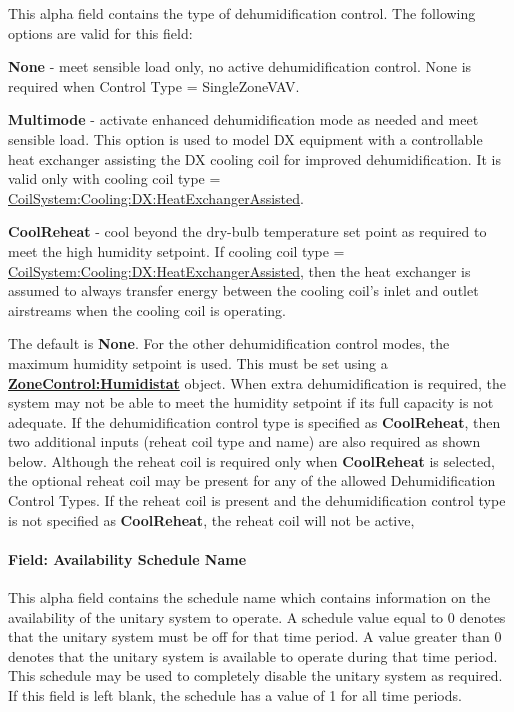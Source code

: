 This alpha field contains the type of dehumidification control. The following options are valid for this field:

\textbf{None} - meet sensible load only, no active dehumidification control. None is required when Control Type = SingleZoneVAV.

\textbf{Multimode} - activate enhanced dehumidification mode as needed and meet sensible load. This option is used to model DX equipment with a controllable heat exchanger assisting the DX cooling coil for improved dehumidification. It is valid only with cooling coil type = \hyperref[coilsystemcoolingdxheatexchangerassisted]{CoilSystem:Cooling:DX:HeatExchangerAssisted}.

\textbf{CoolReheat} - cool beyond the dry-bulb temperature set point as required to meet the high humidity setpoint. If cooling coil type = \hyperref[coilsystemcoolingdxheatexchangerassisted]{CoilSystem:Cooling:DX:HeatExchangerAssisted}, then the heat exchanger is assumed to always transfer energy between the cooling coil's inlet and outlet airstreams when the cooling coil is operating.

The default is \textbf{None}. For the other dehumidification control modes, the maximum humidity setpoint is used. This must be set using a \textbf{\hyperref[zonecontrolhumidistat]{ZoneControl:Humidistat}} object. When extra dehumidification is required, the system may not be able to meet the humidity setpoint if its full capacity is not adequate. If the dehumidification control type is specified as \textbf{CoolReheat}, then two additional inputs (reheat coil type and name) are also required as shown below. Although the reheat coil is required only when \textbf{CoolReheat} is selected, the optional reheat coil may be present for any of the allowed Dehumidification Control Types. If the reheat coil is present and the dehumidification control type is not specified as \textbf{CoolReheat}, the reheat coil will not be active,

\paragraph{Field: Availability Schedule Name}\label{field-availability-schedule-name-017}

This alpha field contains the schedule name which contains information on the availability of the unitary system to operate. A schedule value equal to 0 denotes that the unitary system must be off for that time period. A value greater than 0 denotes that the unitary system is available to operate during that time period. This schedule may be used to completely disable the unitary system as required. If this field is left blank, the schedule has a value of 1 for all time periods.

